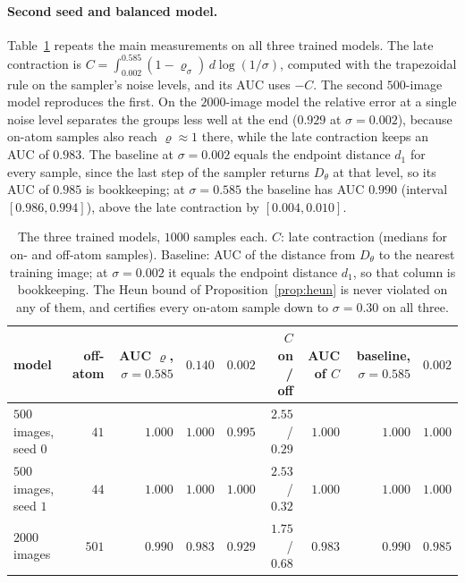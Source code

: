 \documentclass{article} %
\theoremstyle{plain}
\theoremstyle{definition}
\theoremstyle{remark}
\begin{document}
\paragraph{Second seed and balanced model.} Table~\ref{tab:edm-models} repeats the main measurements
on all three trained models. The late contraction is
$C=\int_{0.002}^{0.585}(1-\varrho_\sigma)\,d\log(1/\sigma)$, computed with the trapezoidal rule on the
sampler's noise levels, and its AUC uses $-C$. The second $500$-image model reproduces the first. On
the $2000$-image model the relative error at a single noise level separates the groups less well
at the end ($0.929$ at $\sigma=0.002$), because on-atom samples also reach $\varrho\approx1$ there,
while the late contraction keeps an AUC of $0.983$. The baseline at $\sigma=0.002$ equals the
endpoint distance $d_1$ for every sample, since the last step of the sampler returns $D_\theta$ at
that level, so its AUC of $0.985$ is bookkeeping; at $\sigma=0.585$ the baseline has AUC $0.990$
(interval $[0.986,0.994]$), above the late contraction by $[0.004,0.010]$.

\begin{table}[t]
\centering\footnotesize
\begin{tabular}{@{}lrrrrrrrr@{}}
\toprule
model & off-atom & AUC $\varrho$, $\sigma=0.585$ & $0.140$ & $0.002$ & $C$ on / off & AUC of $C$ & baseline, $\sigma=0.585$ & $0.002$\\
\midrule
$500$ images, seed $0$ & $41$ & $1.000$ & $1.000$ & $0.995$ & $2.55$ / $0.29$ & $1.000$ & $1.000$ & $1.000$\\
$500$ images, seed $1$ & $44$ & $1.000$ & $1.000$ & $1.000$ & $2.53$ / $0.32$ & $1.000$ & $1.000$ & $1.000$\\
$2000$ images & $501$ & $0.990$ & $0.983$ & $0.929$ & $1.75$ / $0.68$ & $0.983$ & $0.990$ & $0.985$\\
\bottomrule
\end{tabular}
\caption{The three trained models, $1000$ samples each. $C$: late contraction (medians for on- and
off-atom samples). Baseline: AUC of the distance from $D_\theta$ to the nearest training image; at
$\sigma=0.002$ it equals the endpoint distance $d_1$, so that column is bookkeeping. The Heun bound
of Proposition~\ref{prop:heun} is never violated on any of them, and certifies every on-atom
sample down to $\sigma=0.30$ on all three.}
\label{tab:edm-models}
\end{table}
\end{document}
